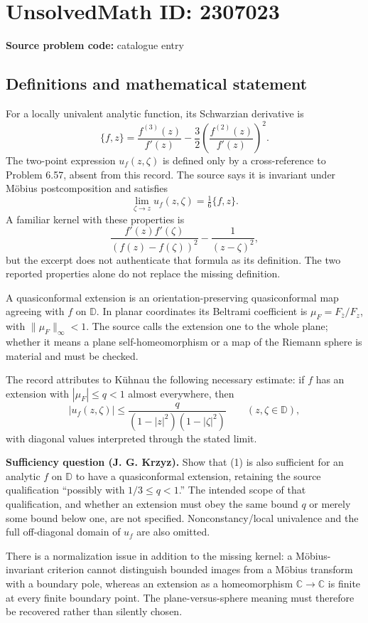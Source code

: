 \documentclass[11pt]{article}
\newcommand{\C}{\mathbb{C}}
\begin{document}
\section*{UnsolvedMath ID: 2307023}
\textbf{Source problem code:} catalogue entry
\subsection{Definitions and mathematical statement}
For a locally univalent analytic function, its Schwarzian derivative is
\[
 \{f,z\}=\frac{f^{(3)}(z)}{f'(z)}-\frac32\left(\frac{f^{(2)}(z)}{f'(z)}\right)^2.
\]
The two-point expression $u_f(z,\zeta)$ is defined only by a cross-reference to Problem 6.57, absent from this record. The source says it is invariant under M\"obius postcomposition and satisfies
\[
 \lim_{\zeta\to z}u_f(z,\zeta)=\tfrac16\{f,z\}.
\]
A familiar kernel with these properties is
\[
 \frac{f'(z)f'(\zeta)}{(f(z)-f(\zeta))^2}-\frac1{(z-\zeta)^2},
\]
but the excerpt does not authenticate that formula as its definition. The two reported properties alone do not replace the missing definition.

A quasiconformal extension is an orientation-preserving quasiconformal map agreeing with $f$ on $\mathbb D$. In planar coordinates its Beltrami coefficient is $\mu_F=F_{\bar z}/F_z$, with $\|\mu_F\|_\infty<1$. The source calls the extension one to the whole plane; whether it means a plane self-homeomorphism or a map of the Riemann sphere is material and must be checked.

The record attributes to K\"uhnau the following necessary estimate: if $f$ has an extension with $|\mu_F|\leq q<1$ almost everywhere, then
\[
 |u_f(z,\zeta)|\leq
 \frac{q}{(1-|z|^2)(1-|\zeta|^2)}\qquad(z,\zeta\in\mathbb D), \tag{1}
\]
with diagonal values interpreted through the stated limit.

\textbf{Sufficiency question (J. G. Krzyz).} Show that (1) is also sufficient for an analytic $f$ on $\mathbb D$ to have a quasiconformal extension, retaining the source qualification ``possibly with $1/3\leq q<1$.'' The intended scope of that qualification, and whether an extension must obey the same bound $q$ or merely some bound below one, are not specified. Nonconstancy/local univalence and the full off-diagonal domain of $u_f$ are also omitted.

There is a normalization issue in addition to the missing kernel: a M\"obius-invariant criterion cannot distinguish bounded images from a M\"obius transform with a boundary pole, whereas an extension as a homeomorphism $\C\to\C$ is finite at every finite boundary point. The plane-versus-sphere meaning must therefore be recovered rather than silently chosen.
\end{document}
